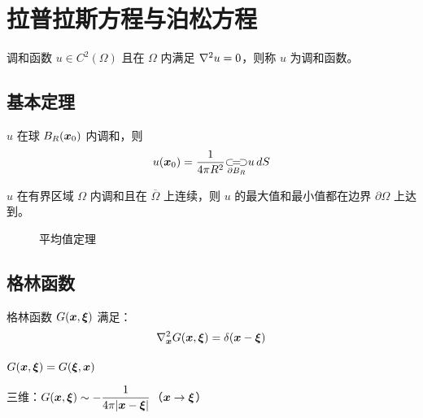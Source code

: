 ﻿\chapter{拉普拉斯方程与泊松方程}

\begin{mydefinition}{调和函数}
$u\in C^2(\Omega)$ 且在 $\Omega$ 内满足 $\nabla^2 u=0$，则称 $u$ 为调和函数。
\end{mydefinition}

\section{基本定理}

\begin{theorem}[平均值定理]
$u$ 在球 $B_R(\boldsymbol{x}_0)$ 内调和，则
\[
u(\boldsymbol{x}_0)=\frac{1}{4\pi R^2}\mathop{\!\subset\!=\!\supset\!}\limits_{\partial B_R}u\,dS
\]
\end{theorem}

\begin{theorem}[极值原理]
$u$ 在有界区域 $\Omega$ 内调和且在 $\overline{\Omega}$ 上连续，则 $u$ 的最大值和最小值都在边界 $\partial\Omega$ 上达到。
\end{theorem}

\begin{figure}[htbp]
\centering
{}
\caption{平均值定理}
\end{figure}

\section{格林函数}

\begin{mydefinition}{格林函数}
$G(\boldsymbol{x},\boldsymbol{\xi})$ 满足：
\[
\nabla^2_{\boldsymbol{x}}G(\boldsymbol{x},\boldsymbol{\xi})=\delta(\boldsymbol{x}-\boldsymbol{\xi})
\]
\end{mydefinition}

\begin{theorem}[格林函数对称性]
$G(\boldsymbol{x},\boldsymbol{\xi})=G(\boldsymbol{\xi},\boldsymbol{x})$
\end{theorem}

\begin{theorem}[格林函数奇异性]
三维：$G(\boldsymbol{x},\boldsymbol{\xi})\sim\displaystyle-\frac{1}{4\pi|\boldsymbol{x}-\boldsymbol{\xi}|}$（$\boldsymbol{x}\to\boldsymbol{\xi}$）
\end{theorem}

